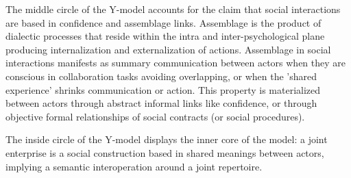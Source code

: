 \documentclass[10pt,twocolumn,ieeetran]{article}
\begin{document}
The middle circle of the Y-model accounts for the claim that social interactions are based in confidence and assemblage links. Assemblage is the product of dialectic processes that reside within the intra and inter-psychological plane \cite{Wertsch} producing internalization and externalization of actions. Assemblage in social interactions manifests as summary communication between actors when they are conscious in collaboration tasks avoiding overlapping, or when the 'shared experience' shrinks communication or action. This property is materialized between actors through abstract informal links like confidence, or through objective formal relationships of social contracts (or social procedures).

The inside circle of the Y-model displays the inner core of the model: a joint enterprise is a social construction based in shared meanings between actors, implying a semantic interoperation around a joint repertoire. 





\end{document}
